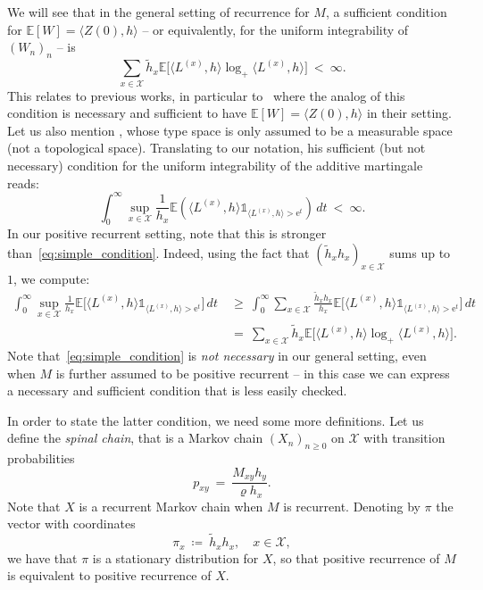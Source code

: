 \begin{refsegment}
We will see that in the general setting of recurrence for $M$, a sufficient condition for $\mathbb{E}[W] = \langle Z(0),h\rangle$ -- or equivalently, for the uniform integrability of $(W_n)_n$ -- is
\begin{equation}\label{eq:simple_condition}\tag{A}
  \sum_{x\in \mathcal{X}} \tilde{h}_x \mathbb{E}\Big[\big\langle L^{(x)},h\big\rangle\log_+\big\langle L^{(x)},h\big\rangle\Big]\ <\ \infty.
\end{equation}
This relates to previous works, in particular to~\citet{asmussen_strong_1976} where the analog of this condition is necessary and sufficient to have $\mathbb{E}[W] = \langle Z(0),h\rangle$ in their setting.
Let us also mention \citet{athreya_change_2000}, whose type space is only assumed to be a measurable space (not a topological space).
Translating to our notation, his sufficient (but not necessary) condition for the uniform integrability of the additive martingale reads:
\[
  \int_0^{\infty} \sup_{x\in \mathcal{X}}\frac{1}{h_x} \mathbb{E}(\langle L^{(x)}, h\rangle \mathds{1}_{\langle L^{(x)}, h\rangle > \mathrm{e}^t}) \,dt\ <\ \infty.
\]
In our positive recurrent setting, note that this is stronger than~\eqref{eq:simple_condition}.
Indeed, using the fact that $(\tilde{h}_xh_x)_{x\in \mathcal{X}}$ sums up to $1$, we compute:
\begin{align*}
  \int_0^{\infty} \sup_{x\in \mathcal{X}}\frac{1}{h_x} \mathbb{E}\big[\langle L^{(x)}, h\rangle \mathds{1}_{\langle L^{(x)}, h\rangle > \mathrm{e}^t}\big]\, dt\ &\geq\ \int_0^{\infty} \sum_{x\in \mathcal{X}}\frac{\tilde{h}_xh_x}{h_x} \mathbb{E}\big[\langle L^{(x)}, h\rangle \mathds{1}_{\langle L^{(x)}, h\rangle > \mathrm{e}^t}\big] \, dt\\
  & =\ \sum_{x\in \mathcal{X}}\tilde{h}_x \mathbb{E}\Big[\langle L^{(x)}, h\rangle \log_+ \langle L^{(x)}, h\rangle \Big].
\end{align*}
Note that~\eqref{eq:simple_condition} is \emph{not necessary} in our general setting, even when $M$ is further assumed to be positive recurrent -- in this case we can express a necessary and sufficient condition that is less easily checked.

In order to state the latter condition, we need some more definitions.
Let us define the \emph{spinal chain}, that is a Markov chain $(X_n)_{n\geq 0}$ on $\mathcal{X}$ with transition probabilities
\begin{equation}\label{eq:spine}
  p_{xy}\ =\ \frac{M_{xy}h_y}{\varrho h_x}.
\end{equation}
Note that $X$ is a recurrent Markov chain when $M$ is recurrent. Denoting by $\pi$ the vector with coordinates
\begin{equation}\label{eq:stationary}
\pi_x\ \coloneqq\ \tilde{h}_xh_x,\quad x\in \mathcal{X},
\end{equation}
we have that $\pi$ is a stationary distribution for $X$, so that positive recurrence of $M$ is equivalent to positive recurrence of $X$.


\end{refsegment}
